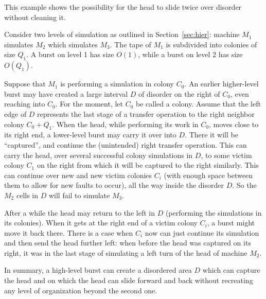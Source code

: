 \documentclass[11pt]{memoir}
\theoremstyle{definition} %
\newcommand{\Q}{Q} %
\begin{document}
\begin{example}\label{xpl:two-slides}
  This example shows the possibility for the head to slide twice over disorder without cleaning it.
  
Consider two levels of simulation as outlined in Section~\ref{sec:hier}: 
machine \( M_{1} \) simulates \( M_{2} \) which simulates \( M_{3} \).
The tape of \( M_{1} \) is subdivided into colonies of size \( \Q_{1} \).
A burst on level 1 has size \( O(1) \), while a burst on level 2 has size \( O(\Q_{1}) \).

Suppose that \( M_{1} \) is performing a simulation in colony \( C_{0} \).
An earlier higher-level burst may have created a large interval \( D \) of disorder
on the right of \( C_{0} \), even reaching into \( C_{0} \).
For the moment, let \( C_{0} \) be called a  colony.
Assume that the left edge of \( D \) represents the last stage of a transfer operation to the right neighbor 
colony \( C_{0}+Q_{1} \).
When the head, while performing its work in \( C_{0} \), moves close to its right end, a
lower-level burst may carry it over into \( D \).
There it will be ``captured'', and continue the (unintended) right transfer operation.
This can carry the head, over several successful colony simulations in \( D \), to some
victim colony \( C_{1} \) on the right from which it will be captured to the right similarly.
This can continue over new and new victim colonies \( C_{i} \) (with enough space between them to
allow for new faults to occur), all the way inside the disorder \( D \).
So the \( M_{2} \) cells in \( D \) will fail to simulate \( M_{3} \).

After a while the head may return to the left in \( D \)
(performing the simulations in its colonies).
When it gets at the right end of a victim colony \( C_{i} \), a burst might move it back there.
There is a case when \( C_{i} \) now can just continue its simulation and then send the head
further left: when before the head was captured on its right,
it was in the last stage of simulating a left turn of the head of machine \( M_{2} \).

In summary, a high-level burst
can create a disordered area \( D \) which can capture the head and on which the head can slide
forward and back without recreating any level of organization beyond the second one.
\end{example}
\end{document}
